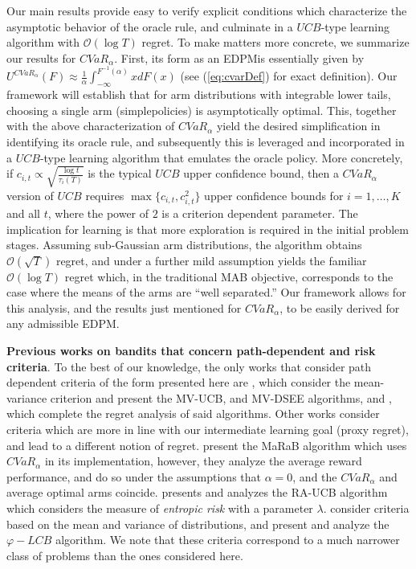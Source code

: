 \documentclass[final,12pt]{colt2018}
\newcommand{\prn}[1]{\left( #1 \right)}
\newcommand{\simple}{simple}
\newcommand{\CVAR}[1][\alpha]{CVaR_{#1}}
\newcommand{\EDRMabbrv}{EDPM}
\newcommand{\RHat}[1][]{{U}^{#1}}
\newcommand{\RHatFunc}[2][]{\RHat[{#1}] \prn{#2}}
\newcommand{\tauIAt}[2][i]{\tau_{#1} \prn{#2}}
\newcommand{\tauI}[1][i]{\tauIAt[#1]{T}}
\begin{document}
	Our main results provide easy to verify explicit conditions which characterize the asymptotic behavior of the oracle rule, and culminate in a $UCB$-type learning algorithm with $\mathcal{O}(\log T)$ regret. To make matters more concrete, we summarize our results for $\CVAR$. First, its form as an \EDRMabbrv\space is essentially given by  $\RHatFunc[\CVAR]{{F}} \approx \frac{1}{\alpha} \int_{-\infty}^{F^{-1}(\alpha)}x dF(x)$ (see (\ref{eq:cvarDef}) for exact definition). Our framework will establish that for arm distributions with integrable lower tails, choosing a single arm (\simple\space policies) is asymptotically optimal. This, together with the above characterization of $\CVAR$ yield the desired simplification in identifying its oracle rule, and subsequently this is leveraged and incorporated in a $UCB$-type learning algorithm that emulates the oracle policy. More concretely, if $c_{i,t} \propto \sqrt{\frac{\log t}{\tauI}}$ is the typical $UCB$ upper confidence bound, then a $\CVAR$ version of $UCB$ requires $\max \{c_{i,t},c_{i,t}^2\}$ upper confidence bounds for $i=1,\ldots,K$ and all $t$, where the power of $2$ is a criterion dependent parameter. The implication for learning is that more exploration is required in the initial problem stages. Assuming sub-Gaussian arm distributions, the algorithm obtains $\mathcal{O}(\sqrt{T})$ regret, and under a further mild assumption yields the familiar $\mathcal{O}(\log T)$ regret which, in the traditional MAB objective, corresponds to the case where the means of the arms are ``well separated.'' Our framework allows for this analysis, and the results just mentioned for $\CVAR$, to be easily derived for any admissible \EDRMabbrv.
	
	\textbf{Previous works on bandits that concern path-dependent and risk criteria}.
	To the best of our knowledge, the only works that consider path dependent criteria of the form presented here are \cite{sani2012risk}, which consider the mean-variance criterion and present the MV-UCB, and MV-DSEE algorithms, and \cite{vakili2016risk}, which complete the regret analysis of said algorithms. Other works consider criteria which are more in line with our intermediate learning goal (proxy regret), and lead to a different notion of regret. \cite{galichet2013exploration} present the MaRaB algorithm which uses $\CVAR$ in its implementation, however, they analyze the average reward performance, and do so under the assumptions that $\alpha = 0$, and the $\CVAR$ and average optimal arms coincide. \cite{maillard2013robust} presents and analyzes the RA-UCB algorithm which considers the measure of \textit{entropic risk} with a parameter $\lambda$. \cite{zimin2014generalized} consider criteria based on the mean and variance of distributions, and present and analyze the $\varphi-LCB$ algorithm. We note that these criteria correspond to a much narrower class of problems than the ones considered here.
	
\end{document}
